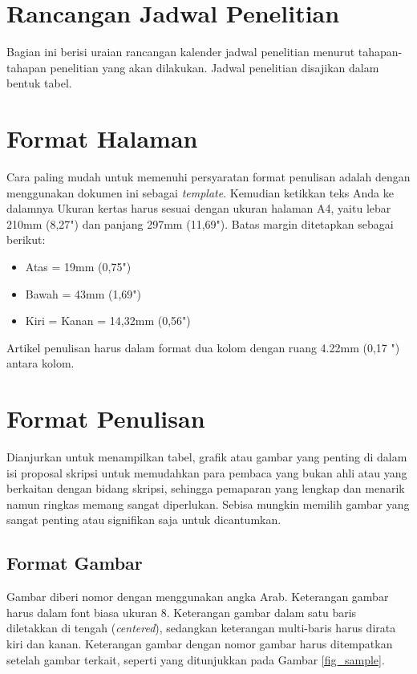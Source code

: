 \documentclass[conference, a4paper]{IEEEtran_ID}
\begin{document}
\section{Rancangan Jadwal Penelitian}

	Bagian ini berisi uraian rancangan kalender jadwal penelitian menurut tahapan-tahapan penelitian yang akan dilakukan. Jadwal penelitian disajikan dalam bentuk tabel.

\section{Format Halaman}

	Cara paling mudah untuk memenuhi persyaratan format penulisan adalah dengan menggunakan dokumen ini sebagai \textit{template}. Kemudian ketikkan teks Anda ke dalamnya Ukuran kertas harus sesuai dengan ukuran halaman A4, yaitu lebar 210mm (8,27") dan panjang 297mm (11,69"). Batas margin ditetapkan sebagai berikut:

	\begin{itemize}
		\item Atas = 19mm (0,75")
		\item Bawah = 43mm (1,69")
		\item Kiri = Kanan = 14,32mm (0,56")
	\end{itemize}
	
	Artikel penulisan harus dalam format dua kolom dengan ruang 4.22mm (0,17 ") antara kolom.

\section{Format Penulisan}

	Dianjurkan untuk menampilkan tabel, grafik atau gambar yang penting di dalam isi proposal skripsi untuk memudahkan para pembaca yang bukan ahli atau yang berkaitan dengan bidang skripsi, sehingga pemaparan yang lengkap dan menarik namun ringkas memang sangat diperlukan. Sebisa mungkin memilih gambar yang sangat penting atau signifikan saja untuk dicantumkan.

\subsection{Format Gambar}
	
	Gambar diberi nomor dengan menggunakan angka Arab. Keterangan gambar harus dalam font biasa ukuran 8. Keterangan gambar dalam satu baris diletakkan di tengah (\textit{centered}), sedangkan keterangan multi-baris harus dirata kiri dan kanan. Keterangan gambar dengan nomor gambar harus ditempatkan setelah gambar terkait, seperti yang ditunjukkan pada Gambar \ref{fig_sample}.
\end{document}
